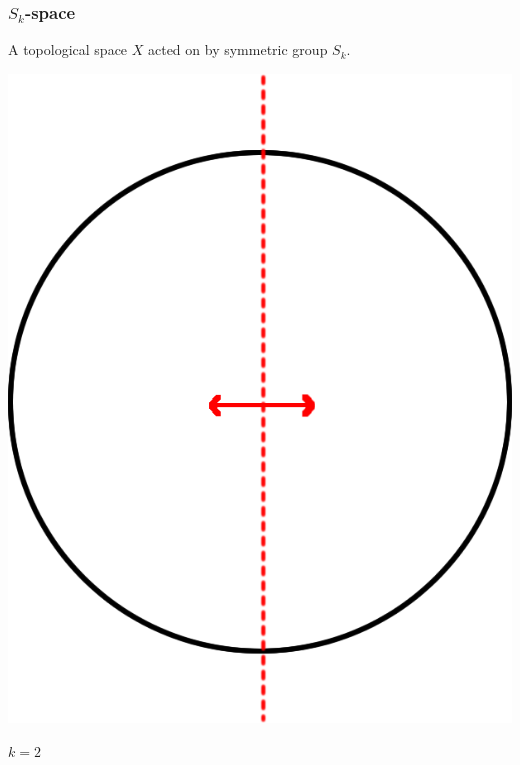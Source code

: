 \documentclass{beamer}[10pt]
\theoremstyle{definition}
\begin{document}
\begin{frame}
\frametitle{$S_k$-space}
\centering
A topological space $X$ acted on by symmetric group $S_k$.

\includegraphics[scale=0.15]{S2Space.png}

$k=2$
\end{frame}
\end{document}
